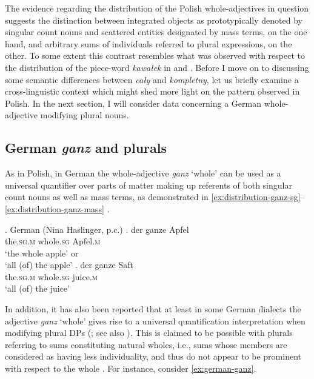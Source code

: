 The evidence regarding the distribution of the Polish whole-adjectives in question suggests the distinction between integrated objects as prototypically denoted by singular count nouns and scattered entities designated by mass terms, on the one hand, and arbitrary sums of individuals referred to plural expressions, on the other. To some extent this contrast resembles what was observed with respect to the distribution of the piece-word \textit{kawałek} in  and . Before I move on to discussing some semantic differences between \textit{cały} and \textit{kompletny}, let us briefly examine a cross-linguistic context which might shed more light on the pattern observed in Polish. In the next section, I will consider data concerning a German whole-adjective modifying plural nouns.

\subsection{German \textit{ganz} and plurals}\label{sec:german-ganz-and-plurals}

As in Polish, in German the whole-adjective \textit{ganz} `whole' can be used as a universal quantifier over parts of matter making up referents of both singular count nouns as well as mass terms, as demonstrated in \ref{ex:distribution-ganz-sg}--\ref{ex:distribution-ganz-mass} \citep[see also][pp. 123--127]{moltmann1997parts}.

\ex. German (Nina Haslinger, p.c.)\label{ex:distribution-ganz}
        \ag. der ganze Apfel\label{ex:distribution-ganz-sg}\\
		the\textsc{.sg.m} whole\textsc{.sg} Apfel\textsc{.m}\\
		`the whole apple' or\\`all (of) the apple'
        \bg. der ganze Saft\label{ex:distribution-ganz-mass}\\
		the\textsc{.sg.m} whole\textsc{.sg} juice\textsc{.m}\\
        `all (of) the juice'

In addition, it has also been reported that at least in some German dialects the adjective \textit{ganz} `whole' gives rise to a universal quantification interpretation when modifying plural DPs (\citealt[pp. 123--127]{moltmann1997parts}; see also \citealt{igel-toappear-part}). This is claimed to be possible with plurals referring to sums constituting natural \linebreak wholes, i.e., sums whose members are considered as having less individuality, and thus do not appear to be prominent with respect to the whole \citep[p. 125]{moltmann1997parts}. For instance, consider \ref{ex:german-ganz}. 

